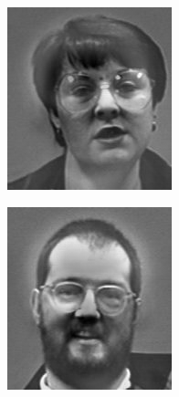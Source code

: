 \begin{figure}
\begin{subfigure}[b]{0.3\textwidth}
\includegraphics[width=\textwidth]{figures/differenceFace0.png}
\end{subfigure}
\begin{subfigure}[b]{0.3\textwidth}
\includegraphics[width=\textwidth]{figures/differenceFace1.png}

\end{subfigure}
\end{figure}
